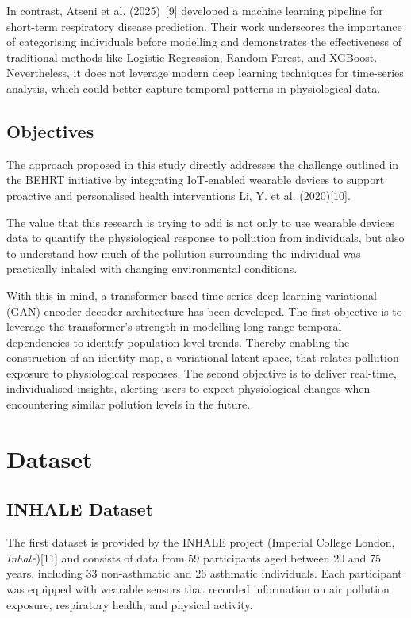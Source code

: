 \documentclass[12pt,a4paper]{report}
\begin{document}
In contrast, Atseni et al. (2025)~[9] developed a machine learning pipeline for short-term respiratory disease prediction. Their work
underscores the importance of categorising individuals before modelling
and demonstrates the effectiveness of traditional methods like Logistic
Regression, Random Forest, and XGBoost. Nevertheless, it does not
leverage modern deep learning techniques for time-series analysis, which
could better capture temporal patterns in physiological data.


\section{Objectives}
The approach proposed in this study directly addresses the challenge
outlined in the BEHRT initiative by integrating IoT-enabled wearable
devices to support proactive and personalised health interventions Li,
Y. et al. (2020){[}10{]}.

The value that this research is trying to add is not only to use
wearable devices data to quantify the physiological response to
pollution from individuals, but also to understand how much of the
pollution surrounding the individual was practically inhaled with
changing environmental conditions.

With this in mind, a transformer-based time series deep learning
variational (GAN) encoder decoder architecture has been developed. The
first objective is to leverage the transformer's strength in modelling
long-range temporal dependencies to identify population-level trends.
Thereby enabling the construction of an identity map, a variational
latent space, that relates pollution exposure to physiological
responses. The second objective is to deliver real-time, individualised
insights, alerting users to expect physiological changes when
encountering similar pollution levels in the future.

\chapter{Dataset}
\section{INHALE Dataset}
The first dataset is provided by the INHALE project (Imperial College
London, \emph{Inhale}){[}11{]} and consists of data from 59 participants
aged between 20 and 75 years, including 33 non-asthmatic and 26
asthmatic individuals. Each participant was equipped with wearable
sensors that recorded information on air pollution exposure, respiratory
health, and physical activity.
\end{document}
